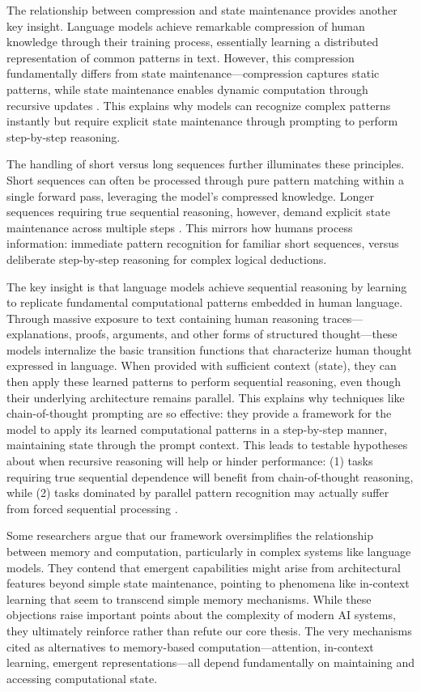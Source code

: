 \documentclass[12pt]{article}
\begin{document}
The relationship between compression and state maintenance provides another key insight.
Language models achieve remarkable compression of human knowledge through their training process, essentially learning a distributed representation of common patterns in text.
However, this compression fundamentally differs from state maintenance---compression captures static patterns, while state maintenance enables dynamic computation through recursive updates \cite{dickson2024trust}.
This explains why models can recognize complex patterns instantly but require explicit state maintenance through prompting to perform step-by-step reasoning.

The handling of short versus long sequences further illuminates these principles.
Short sequences can often be processed through pure pattern matching within a single forward pass, leveraging the model's compressed knowledge.
Longer sequences requiring true sequential reasoning, however, demand explicit state maintenance across multiple steps \cite{wei2022chain}.
This mirrors how humans process information: immediate pattern recognition for familiar short sequences, versus deliberate step-by-step reasoning for complex logical deductions.

The key insight is that language models achieve sequential reasoning by learning to replicate fundamental computational patterns embedded in human language.
Through massive exposure to text containing human reasoning traces---explanations, proofs, arguments, and other forms of structured thought---these models internalize the basic transition functions that characterize human thought expressed in language.
When provided with sufficient context (state), they can then apply these learned patterns to perform sequential reasoning, even though their underlying architecture remains parallel.
This explains why techniques like chain-of-thought prompting are so effective: they provide a framework for the model to apply its learned computational patterns in a step-by-step manner, maintaining state through the prompt context.
This leads to testable hypotheses about when recursive reasoning will help or hinder performance: (1) tasks requiring true sequential dependence will benefit from chain-of-thought reasoning, while (2) tasks dominated by parallel pattern recognition may actually suffer from forced sequential processing \cite{liu2024mind}.

Some researchers argue that our framework oversimplifies the relationship between memory and computation, particularly in complex systems like language models. They contend that emergent capabilities might arise from architectural features beyond simple state maintenance, pointing to phenomena like in-context learning that seem to transcend simple memory mechanisms. While these objections raise important points about the complexity of modern AI systems, they ultimately reinforce rather than refute our core thesis. The very mechanisms cited as alternatives to memory-based computation---attention, in-context learning, emergent representations---all depend fundamentally on maintaining and accessing computational state.
\end{document}
